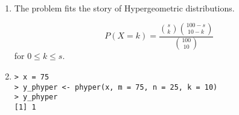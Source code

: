 \begin{enumerate}[label=(\alph*)]
\item The problem fits the story of Hypergeometric distributions.

$$P(X = k) = \frac{\binom{s}{k}\binom{100-s}{10-k}}{\binom{100}{10}}$$
for $0 \leq k \leq s$.

\item 
\begin{verbatim}
> x = 75
> y_phyper <- phyper(x, m = 75, n = 25, k = 10)
> y_phyper
[1] 1
\end{verbatim}
\end{enumerate}